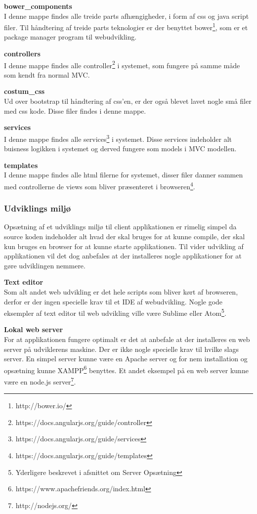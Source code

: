 \textbf{bower\_components}\\
I denne mappe findes alle treide parts afhængigheder, i form af css og java script filer. Til håndtering af treide parts teknologier er der benyttet bower\footnote{http://bower.io/}, som er et package manager program til webudvikling.

\textbf{controllers}\\
I denne mappe findes alle controller\footnote{https://docs.angularjs.org/guide/controller} i systemet, som fungere på samme måde som kendt fra normal MVC.

\textbf{costum\_css}\\
Ud over bootstrap til håndtering af css'en, er der også blevet lavet nogle små filer med css kode. Disse filer findes i denne mappe.

\textbf{services}\\
I denne mappe findes alle services\footnote{https://docs.angularjs.org/guide/services} i systemet. Disse services indeholder alt buisness logikken i systemet og derved fungere som models i MVC modellen.

\textbf{templates}\\
I denne mappe findes alle html filerne for systemet, disser filer danner sammen med controllerne de views som bliver præsenteret i browseren\footnote{https://docs.angularjs.org/guide/templates}.

\subsubsection{Udviklings miljø}
Opsætning af et udviklings miljø til client applikationen er rimelig simpel da source koden indeholder alt hvad der skal bruges for at kunne compile, der skal kun bruges en browser for at kunne starte applikationen. Til vider udvikling af applikationen vil det dog anbefales at der installeres nogle applikationer for at gøre udviklingen nemmere.

\textbf{Text editor}\\
Som alt andet web udvikling er det hele scripts som bliver kørt af browseren, derfor er der ingen specielle krav til et IDE af webudvikling. Nogle gode eksempler af text editor til web udvikling ville være Sublime eller Atom\footnote{Yderligere beskrevet i afsnittet om Server Opsætning}.

\textbf{Lokal web server}\\
For at applikationen fungere optimalt er det at anbefale at der installeres en web server på udviklerens maskine. Der er ikke nogle specielle krav til hvilke slags server. En simpel server kunne være en Apache server og for nem installation og opsætning kunne XAMPP\footnote{https://www.apachefriends.org/index.html} benyttes. Et andet eksempel på en web server kunne være en node.js server\footnote{http://nodejs.org/}. 

